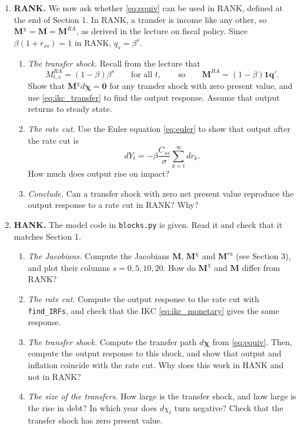 \begin{enumerate}
\item \textbf{RANK.} We now ask whether \eqref{eq:equiv} can be used in RANK, defined at the end of Section 1. In RANK, a transfer is income like any other, so $\boldsymbol{M}^{\chi}=\boldsymbol{M}=\boldsymbol{M}^{RA}$, as derived in the lecture on fiscal policy. Since $\beta(1+r_{ss})=1$ in RANK, $q_{s}=\beta^{s}$.
\begin{enumerate}
\item \emph{The transfer shock.} Recall from the lecture that
$$M^{RA}_{t,s}=(1-\beta)\beta^{s}\qquad\text{for all }t,\qquad\text{so}\qquad\boldsymbol{M}^{RA}=(1-\beta)\boldsymbol{1}\boldsymbol{q}'.$$
Show that $\boldsymbol{M}^{\chi}d\boldsymbol{\chi}=\boldsymbol{0}$ for any transfer shock with zero present value, and use \eqref{eq:ikc_transfer} to find the output response. Assume that output returns to steady state.
\item \emph{The rate cut.} Use the Euler equation \eqref{eq:euler} to show that output after the rate cut is
$$dY_t=-\beta\frac{C_{ss}}{\sigma}\sum_{k=t}^{\infty}dr_k.$$
How much does output rise on impact?
\item \emph{Conclude.} Can a transfer shock with zero net present value reproduce the output response to a rate cut in RANK? Why?
\end{enumerate}

\item \textbf{HANK.} The model code in \texttt{blocks.py} is given. Read it and check that it matches Section 1.
\begin{enumerate}
\item \emph{The Jacobians.} Compute the Jacobians $\boldsymbol{M}$, $\boldsymbol{M}^{\chi}$ and $\boldsymbol{M}^{ra}$ (see Section 3), and plot their columns $s=0,5,10,20$. How do $\boldsymbol{M}^{\chi}$ and $\boldsymbol{M}$ differ from RANK?
\item \emph{The rate cut.} Compute the output response to the rate cut with \texttt{find\_IRFs}, and check that the IKC \eqref{eq:ikc_monetary} gives the same response.
\item \emph{The transfer shock.} Compute the transfer path $d\boldsymbol{\chi}$ from \eqref{eq:equiv}. Then, compute the output response to this shock, and show that output and inflation coincide with the rate cut. Why does this work in HANK and not in RANK?
\item \emph{The size of the transfers.} How large is the transfer shock, and how large is the rise in debt? In which year does $d\chi_{t}$ turn negative? Check that the transfer shock has zero present value.
\end{enumerate}


\end{enumerate}
